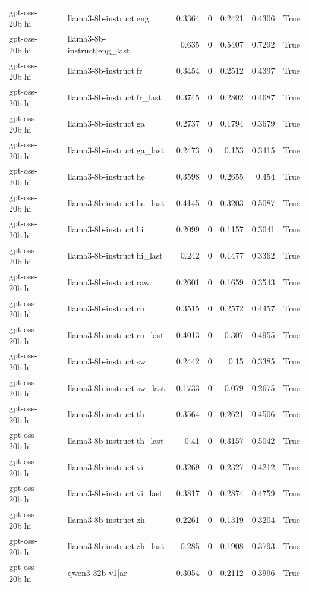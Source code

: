 \begin{table}
\begin{tabular}{l l r r r r l}
gpt-oss-20b|hi & llama3-8b-instruct|eng & 0.3364 & 0 & 0.2421 & 0.4306 & True \\
gpt-oss-20b|hi & llama3-8b-instruct|eng_last & 0.635 & 0 & 0.5407 & 0.7292 & True \\
gpt-oss-20b|hi & llama3-8b-instruct|fr & 0.3454 & 0 & 0.2512 & 0.4397 & True \\
gpt-oss-20b|hi & llama3-8b-instruct|fr_last & 0.3745 & 0 & 0.2802 & 0.4687 & True \\
gpt-oss-20b|hi & llama3-8b-instruct|ga & 0.2737 & 0 & 0.1794 & 0.3679 & True \\
gpt-oss-20b|hi & llama3-8b-instruct|ga_last & 0.2473 & 0 & 0.153 & 0.3415 & True \\
gpt-oss-20b|hi & llama3-8b-instruct|he & 0.3598 & 0 & 0.2655 & 0.454 & True \\
gpt-oss-20b|hi & llama3-8b-instruct|he_last & 0.4145 & 0 & 0.3203 & 0.5087 & True \\
gpt-oss-20b|hi & llama3-8b-instruct|hi & 0.2099 & 0 & 0.1157 & 0.3041 & True \\
gpt-oss-20b|hi & llama3-8b-instruct|hi_last & 0.242 & 0 & 0.1477 & 0.3362 & True \\
gpt-oss-20b|hi & llama3-8b-instruct|raw & 0.2601 & 0 & 0.1659 & 0.3543 & True \\
gpt-oss-20b|hi & llama3-8b-instruct|ru & 0.3515 & 0 & 0.2572 & 0.4457 & True \\
gpt-oss-20b|hi & llama3-8b-instruct|ru_last & 0.4013 & 0 & 0.307 & 0.4955 & True \\
gpt-oss-20b|hi & llama3-8b-instruct|sw & 0.2442 & 0 & 0.15 & 0.3385 & True \\
gpt-oss-20b|hi & llama3-8b-instruct|sw_last & 0.1733 & 0 & 0.079 & 0.2675 & True \\
gpt-oss-20b|hi & llama3-8b-instruct|th & 0.3564 & 0 & 0.2621 & 0.4506 & True \\
gpt-oss-20b|hi & llama3-8b-instruct|th_last & 0.41 & 0 & 0.3157 & 0.5042 & True \\
gpt-oss-20b|hi & llama3-8b-instruct|vi & 0.3269 & 0 & 0.2327 & 0.4212 & True \\
gpt-oss-20b|hi & llama3-8b-instruct|vi_last & 0.3817 & 0 & 0.2874 & 0.4759 & True \\
gpt-oss-20b|hi & llama3-8b-instruct|zh & 0.2261 & 0 & 0.1319 & 0.3204 & True \\
gpt-oss-20b|hi & llama3-8b-instruct|zh_last & 0.285 & 0 & 0.1908 & 0.3793 & True \\
gpt-oss-20b|hi & qwen3-32b-v1|ar & 0.3054 & 0 & 0.2112 & 0.3996 & True \\

\end{tabular}
\end{table}
